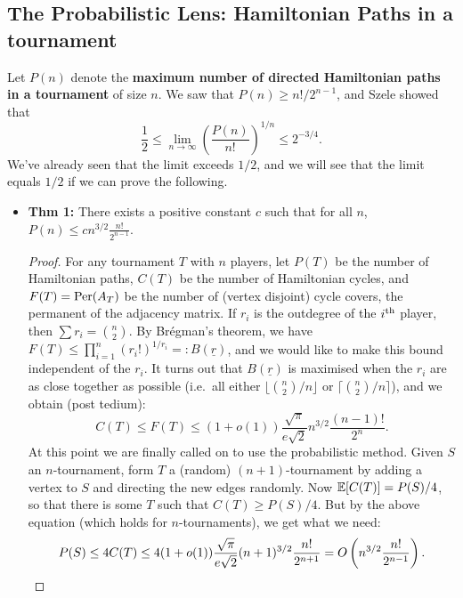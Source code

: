 \documentclass[11pt]{article}
\newenvironment{INT}[1][]{\begin{itemize}\small\item\textbf{#1}}{\end{itemize}}
\begin{document}
\begin{chapter4}
\subsection*{The Probabilistic Lens: Hamiltonian Paths in a tournament}
Let $P(n)$ denote the \textbf{maximum number of directed Hamiltonian paths in a tournament} of size $n$. We saw that $P(n)\geq n!/2^{n-1}$, and Szele showed that
\[\frac{1}{2}\leq\lim_{n\rightarrow\infty}\left(\frac{P(n)}{n!}\right)^{1/n}\leq2^{-3/4}.\]
We've already seen that the limit exceeds $1/2$, and we will see that the limit equals $1/2$ if we can prove the following.
\begin{INT}[Thm 1:] There exists a positive constant $c$ such that for all $n$,
$P(n)\leq cn^{3/2}\frac{n!}{2^{n-1}}$.
\begin{proof}
For any tournament $T$ with $n$ players, let $P(T)$ be the number of Hamiltonian paths, $C(T)$ be the number of Hamiltonian cycles, and $F(T)=\textup{Per}(A_T)$ be the number of (vertex disjoint) cycle covers, the permanent of the adjacency matrix. If $r_i$ is the outdegree of the $i^\textup{th}$ player, then $\sum r_i={n\choose2}$. By Br\'egman's theorem, we have $F(T)\leq\prod_{i=1}^n(r_i!)^{1/r_i}=:B(\underline{r})$, and we would like to make this bound independent of the $r_i$. It turns out that $B(\underline{r})$ is maximised when the $r_i$ are as close together as possible (i.e.\ all either $\lfloor{n\choose2}/n\rfloor$ or $\lceil{n\choose2}/n\rceil$), and we obtain (post tedium):
\[C(T)\leq F(T)\leq (1+o(1))\frac{\sqrt\pi}{e\sqrt2}n^{3/2}\frac{(n-1)!}{2^n}.\]
At this point we are finally called on to use the probabilistic method. Given $S$ an $n$-tournament, form $T$ a (random) $(n+1)$-tournament by adding a vertex to $S$ and directing the new edges randomly. Now $\operatorname{\mathbb{E}}[C(T)]=P(S)/4$, so that there is some $T$ such that $C(T)\geq P(S)/4$. But by the above equation (which holds for $n$-tournaments), we get what we need:
\[P(S)\leq 4C(T)\leq 4(1+o(1))\frac{\sqrt\pi}{e\sqrt2}(n+1)^{3/2}\frac{n!}{2^{n+1}}=O\left(n^{3/2}\frac{n!}{2^{n-1}}\right).\qedhere\]

\end{proof}
\end{INT}
\end{chapter4}
\end{document}

